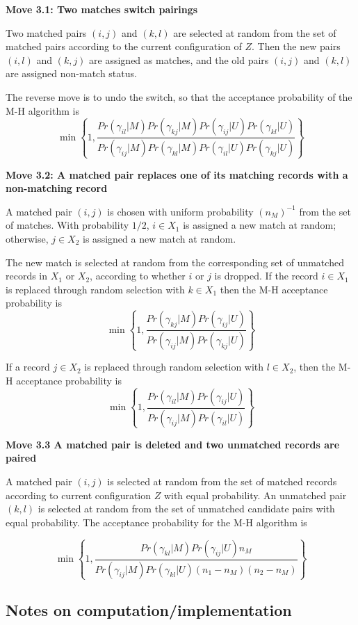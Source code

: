 \documentclass[11pt,reqno]{amsart}
\begin{document}
\textbf{Move 3.1: Two matches switch pairings}

Two matched pairs $(i,j)$ and $(k, l)$ are selected at random from the set of matched pairs according to the current configuration of $Z$.   Then the new pairs $(i,l)$ and $(k,j)$ are assigned as matches, and the old pairs $(i,j)$ and $(k,l)$ are assigned non-match status. 

The reverse move is to undo the switch, so that the acceptance probability of the M-H algorithm is
\[ \min \left\{ 1, \frac{Pr(\gamma_{il} | M) Pr(\gamma_{kj} | M) Pr(\gamma_{ij} | U) Pr(\gamma_{kl} | U)}{Pr(\gamma_{ij} | M) Pr(\gamma_{kl} | M) Pr(\gamma_{il} | U) Pr(\gamma_{kj} | U)} \right\} \] 

\textbf{Move 3.2: A matched pair replaces one of its matching records with a non-matching record}

A matched pair $(i,j)$ is chosen with uniform probability $(n_M)^{-1}$ from the set of matches.  With probability $1/2$, $i\in X_1$ is assigned a new match at random; otherwise, $j\in X_2$ is assigned a new match at random.

The new match is selected at random from the corresponding set of unmatched records in $X_1$ or $X_2$, according to whether $i$ or $j$ is dropped.   If the record $i \in X_1$ is replaced through random selection with $k \in X_1$ then the M-H acceptance probability is
\[ \min \left\{ 1, \frac{Pr(\gamma_{kj} | M) Pr(\gamma_{ij} | U)}{Pr(\gamma_{ij}| M) Pr(\gamma_{kj} | U)} \right\} \]

If a record $j\in X_2$ is replaced through random selection with $l \in X_2$, then the M-H acceptance probability is 
\[ \min \left\{1, \frac{Pr(\gamma_{il} | M) Pr(\gamma_{ij} | U)}{Pr(\gamma_{ij} | M) Pr(\gamma_{il} | U)} \right\} \]

\textbf{Move 3.3 A matched pair is deleted and two unmatched records are paired}

A matched pair $(i,j)$ is selected at random from the set of matched records according to current configuration $Z$ with equal probability.  An unmatched pair $(k,l)$ is selected at random from the set of unmatched candidate pairs with equal probability.   The acceptance probability for the M-H algorithm is

\[ \min \left\{1,  \frac{Pr(\gamma_{kl} | M)Pr(\gamma_{ij} | U) n_M}{Pr(\gamma_{ij} | M) Pr(\gamma_{kl} | U) (n_1 - n_M)(n_2 - n_M)} \right\} \]

\subsection{Notes on computation/implementation}
\end{document}
